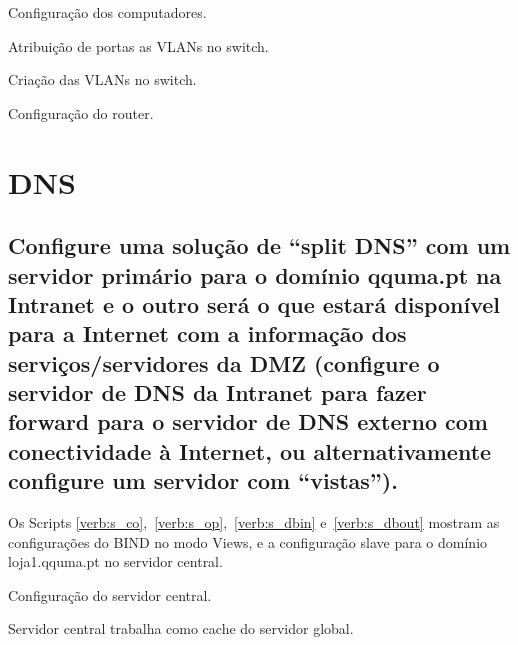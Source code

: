 \documentclass[a4paper,12pt]{article}
\begin{document}
\begin{program}
   
   \caption{Configuração dos computadores.}
   \label{verb:gnus}
\end{program}

\begin{program}
   
   \caption{Atribuição de portas as VLANs no switch.}
   \label{verb:switch_ports}
\end{program}

\begin{program}
   
   \caption{Criação das VLANs no switch.}
   \label{verb:swicth_vlan}
\end{program}

\begin{program}
   
   \caption{Configuração do router.}
   \label{verb:router}
\end{program}

\section{DNS}
\subsection{Configure uma solução de “split DNS” com um servidor primário para o
domínio qquma.pt na Intranet e o outro será o que estará disponível para a
Internet com a informação dos serviços/servidores da DMZ (configure o
servidor de DNS da Intranet para fazer forward para o servidor de DNS
externo com conectividade à Internet, ou alternativamente configure um
servidor com “vistas”).}

Os Scripts \ref{verb:s_co},~\ref{verb:s_op},~\ref{verb:s_dbin} e~\ref{verb:s_dbout}
mostram as configurações do BIND no modo Views, e a configuração
slave para o domínio loja1.qquma.pt no servidor central.

\begin{program}
   
   \caption{Configuração do servidor central.}
   \label{verb:s_co}
\end{program}

\begin{program}
   
   \caption{Servidor central trabalha como cache do servidor global.}
   \label{verb:s_op}
\end{program}
\end{document}
